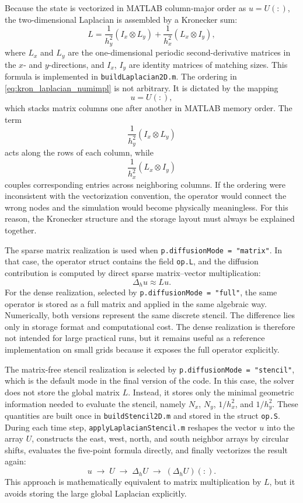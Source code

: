Because the state is vectorized in MATLAB column-major order as $u = U(:)$, the two-dimensional Laplacian is assembled by a Kronecker sum:
\begin{equation}
L
=
\frac{1}{h_y^2}\left(I_x \otimes L_y\right)
+
\frac{1}{h_x^2}\left(L_x \otimes I_y\right),
\label{eq:kron_laplacian_numimpl}
\end{equation}
where $L_x$ and $L_y$ are the one-dimensional periodic second-derivative matrices in the $x$- and $y$-directions, and $I_x$, $I_y$ are identity matrices of matching sizes. This formula is implemented in \texttt{buildLaplacian2D.m}. The ordering in \eqref{eq:kron_laplacian_numimpl} is not arbitrary. It is dictated by the mapping
\[
u = U(:),
\]
which stacks matrix columns one after another in MATLAB memory order. The term
\[
\frac{1}{h_y^2}(I_x \otimes L_y)
\]
acts along the rows of each column, while
\[
\frac{1}{h_x^2}(L_x \otimes I_y)
\]
couples corresponding entries across neighboring columns. If the ordering were inconsistent with the vectorization convention, the operator would connect the wrong nodes and the simulation would become physically meaningless. For this reason, the Kronecker structure and the storage layout must always be explained together.

The sparse matrix realization is used when \texttt{p.diffusionMode = "matrix"}. In that case, the operator struct contains the field \texttt{op.L}, and the diffusion contribution is computed by direct sparse matrix--vector multiplication:
\[
\Delta_h u \approx L u.
\]
For the dense realization, selected by \texttt{p.diffusionMode = "full"}, the same operator is stored as a full matrix and applied in the same algebraic way. Numerically, both versions represent the same discrete stencil. The difference lies only in storage format and computational cost. The dense realization is therefore not intended for large practical runs, but it remains useful as a reference implementation on small grids because it exposes the full operator explicitly.

The matrix-free stencil realization is selected by \texttt{p.diffusionMode = "stencil"}, which is the default mode in the final version of the code. In this case, the solver does not store the global matrix $L$. Instead, it stores only the minimal geometric information needed to evaluate the stencil, namely $N_x$, $N_y$, $1/h_x^2$, and $1/h_y^2$. These quantities are built once in \texttt{buildStencil2D.m} and stored in the struct \texttt{op.S}. During each time step, \texttt{applyLaplacianStencil.m} reshapes the vector $u$ into the array $U$, constructs the east, west, north, and south neighbor arrays by circular shifts, evaluates the five-point formula directly, and finally vectorizes the result again:
\[
u \;\rightarrow\; U
\;\rightarrow\; \Delta_h U
\;\rightarrow\; (\Delta_h U)(:).
\]
This approach is mathematically equivalent to matrix multiplication by $L$, but it avoids storing the large global Laplacian explicitly.

